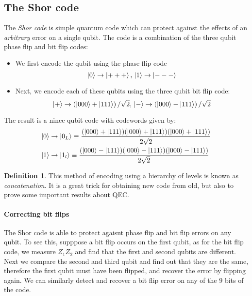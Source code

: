 \documentclass[11pt,a4paper]{article}
\theoremstyle{definition}
\newtheorem{definition}{Definition}[section]
\theoremstyle{plain}
\theoremstyle{remark}
\begin{document}
\subsection{The Shor code}
The \emph{Shor code} is simple quantum code which can protect against the effects of an \emph{arbitrary} error on a single qubit. 
The code is a combination of the three qubit phase flip and bit flip codes: 
\begin{itemize}
\item We first encode the qubit using the phase flip code 
$$\ket{0} \to \ket{+++}, \, \ket{1} \to \ket{---}$$

\item Next, we encode each of these qubits using the three qubit bit flip code: 
$$\ket{+} \to \left(\ket{000} + \ket{111}\right) / \sqrt{2}, \, \ket{-} \to \left(\ket{000} - \ket{111}\right) / \sqrt{2}$$
\end{itemize}
The result is a nince qubit code with codewords given by: 
\begin{align*}
\ket{0} &\to \ket{0_L} \equiv \frac{(\ket{000} + \ket{111}) (\ket{000} + \ket{111})(\ket{000} + \ket{111})}{2 \sqrt{2}} \\
\ket{1} &\to \ket{1_l} \equiv \frac{(\ket{000} - \ket{111}) (\ket{000} - \ket{111})(\ket{000} - \ket{111})}{2 \sqrt{2}}
\end{align*}

\begin{definition}
This method of encoding using a hierarchy of levels is known as \emph{concatenation}. It is a great trick for obtaining 
new code from old, but also to prove some important results about QEC. 
\end{definition}

\paragraph{Correcting bit flips}
The Shor code is able to protect agaisnt phase flip and bit flip errors on any qubit. To see this, supppose a bit flip occurs on the first qubit, 
as for the bit flip code, we measure $Z_1 Z_2$ and find that the first and second qubits are different. Next we compare the second and third qubit 
and find out that they are the same, therefore the first qubit must have been flipped, and recover the error by flipping again. We can similarly detect and recover 
a bit flip error on any of the $9$ bits of the code. 
\end{document}
